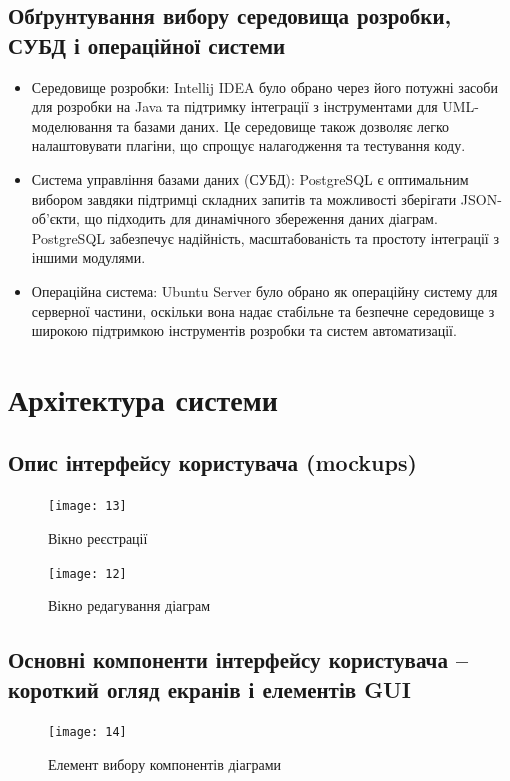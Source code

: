 \documentclass[oneside,14pt]{extarticle}
\begin{document}
\begin{normalsize}
	\subsection{Обґрунтування вибору середовища розробки, СУБД і операційної системи}
	\begin{itemize}
		\item Середовище розробки: Intellij IDEA було обрано через його потужні засоби для розробки на Java та підтримку інтеграції з інструментами для UML-моделювання та базами даних. Це середовище також дозволяє легко налаштовувати плагіни, що спрощує налагодження та тестування коду.
		\item Система управління базами даних (СУБД): PostgreSQL є оптимальним вибором завдяки підтримці складних запитів та можливості зберігати JSON-об'єкти, що підходить для динамічного збереження даних діаграм. PostgreSQL забезпечує надійність, масштабованість та простоту інтеграції з іншими модулями.
		\item Операційна система: Ubuntu Server було обрано як операційну систему для серверної частини, оскільки вона надає стабільне та безпечне середовище з широкою підтримкою інструментів розробки та систем автоматизації.
	\end{itemize}
	
	\section{Архітектура системи}
	\subsection{Опис інтерфейсу користувача (mockups)}
	\begin{figure}[H]
		\centering
		\texttt{[image: 13]}
		\caption{Вікно реєстрації}
	\end{figure}
	
	\begin{figure}[H]
		\centering
		\texttt{[image: 12]}
		\caption{Вікно редагування діаграм}
	\end{figure}
	
	\subsection{Основні компоненти інтерфейсу користувача – короткий огляд екранів і елементів GUI}
	\begin{figure}[H]
		\centering
		\texttt{[image: 14]}
		\caption{Елемент вибору компонентів діаграми}
	\end{figure}
	

\end{normalsize}
\end{document}
